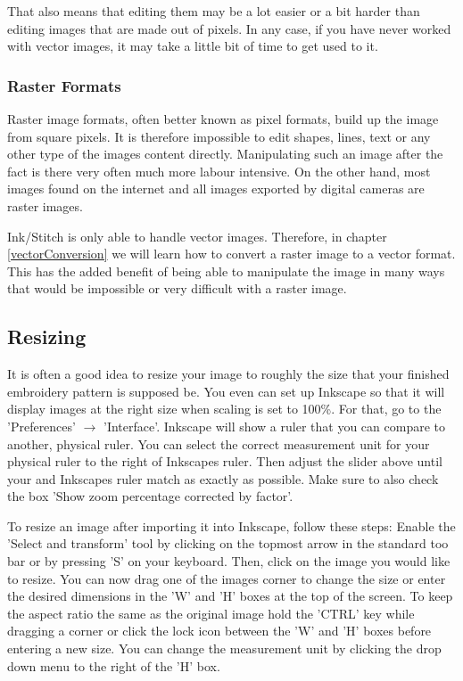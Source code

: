 \documentclass{article}
\begin{document}
                That also means that editing them may be a lot easier or a bit harder than editing images that are made out of pixels.
                In any case, if you have never worked with vector images, it may take a little bit of time to get used to it.

            \subsubsection{Raster Formats}

                Raster image formats, often better known as pixel formats, build up the image from square pixels. It is therefore impossible to edit shapes, lines, text or any other type of the images content directly.
                Manipulating such an image after the fact is there very often much more labour intensive. On the other hand, most images found on the internet and all images exported by digital cameras are raster images.

                Ink/Stitch is only able to handle vector images. Therefore, in chapter \ref{vectorConversion}  we will learn how to  convert a raster image to a vector format.
                This has the added benefit of being able to manipulate the image in many ways that would be impossible or very difficult with a raster image.
        
        \subsection{Resizing}

        It is often a good idea to resize your image to roughly the size that your finished embroidery pattern is supposed be.
        You even can set up Inkscape so that it will display images at the right size when scaling is set to 100\%. For that, go to the 'Preferences' $\rightarrow$ 'Interface'.
        Inkscape will show a ruler that you can compare to another, physical ruler. You can select the correct measurement unit for your physical ruler to the right of Inkscapes ruler. Then adjust the slider above until your and Inkscapes ruler match as exactly as possible.
        Make sure to also check the box 'Show zoom percentage corrected by factor'.

        To resize an image after importing it into Inkscape, follow these steps:
        Enable the 'Select and transform' tool by clicking on the topmost arrow in the standard too bar or by pressing 'S' on your keyboard.  
        Then, click on the image you would like to resize. You can now drag one of the images corner to change the size or enter the desired dimensions in the 'W' and 'H' boxes at the top of the screen.
        To keep the aspect ratio the same as the original image hold the 'CTRL' key while dragging a corner or click the lock icon between the 'W' and 'H' boxes before entering a new size.
        You can change the measurement unit by clicking the drop down menu to the right of the 'H' box.
\end{document}
